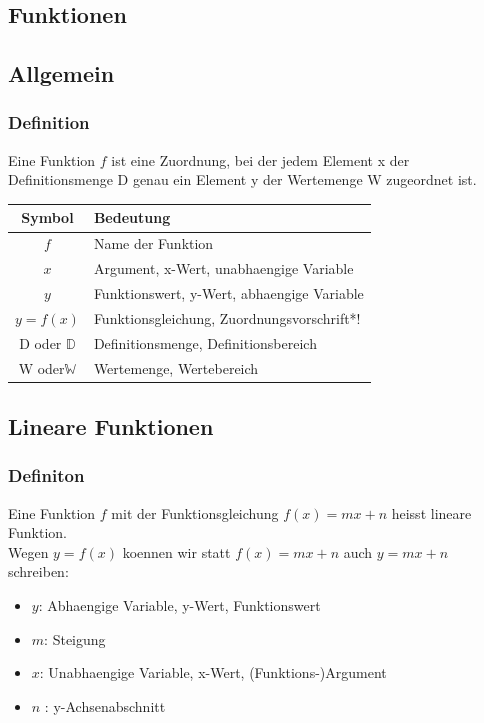 \begin{multicols}{2}
    \newpage


    \section{Funktionen}
    \vspace{-4mm}
    \subsection{Allgemein}
    \vspace{-4mm}
    \subsubsection{Definition}
    \vspace{-4mm}
    Eine Funktion $f$ ist eine Zuordnung, bei der jedem Element x der Definitionsmenge D genau ein Element y der Wertemenge W zugeordnet ist.

    \begin{tabularx}{0.5\textwidth} {
            | >{\raggedright\arraybackslash}c
            | >{\raggedright\arraybackslash}X |}
        \hline
        \textbf{Symbol}     & \textbf{Bedeutung}                         \\ \hline
        $f$                 & Name der Funktion                          \\ \hline
        $x$                 & Argument, x-Wert, unabhaengige Variable    \\  \hline
        $y$                 & Funktionswert, y-Wert, abhaengige Variable \\  \hline
        $y = f(x)$          & Funktionsgleichung, Zuordnungsvorschrift*! \\ \hline
        D oder $\mathbb{D}$ & Definitionsmenge, Definitionsbereich       \\  \hline
        W oder$\mathbb{W}$  & Wertemenge, Wertebereich                   \\  \hline
    \end{tabularx}
    \subsection{Lineare Funktionen}
    \vspace{-4mm}
    \subsubsection{Definiton}
    \vspace{-4mm}
    Eine Funktion $f$ mit der Funktionsgleichung $f(x) = mx + n$ heisst lineare Funktion. \\
    Wegen $y = f(x)$ koennen wir statt $f(x) = mx + n$ auch $y = mx + n$ schreiben:
    \begin{itemize}
        \item $y$: Abhaengige Variable, y-Wert, Funktionswert
        \item $m$: Steigung
        \item  $x$: Unabhaengige Variable, x-Wert, (Funktions-)Argument
        \item $n$ : y-Achsenabschnitt
    \end{itemize}

\end{multicols}

